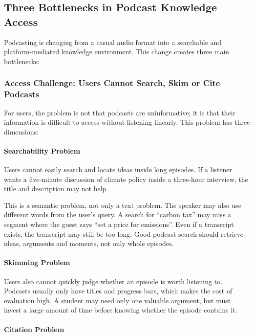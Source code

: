 \documentclass[11pt,a4paper]{article}
\begin{document}
\subsection{Three Bottlenecks in Podcast Knowledge Access}

Podcasting is changing from a casual audio format into a searchable and platform-mediated knowledge environment. This change creates three main bottlenecks:

\subsubsection{Access Challenge: Users Cannot Search, Skim or Cite Podcasts}

For users, the problem is not that podcasts are uninformative; it is that their information is difficult to access without listening linearly. This problem has three dimensions:



\paragraph{Searchability Problem}

Users cannot easily search and locate ideas inside long episodes. If a listener wants a five-minute discussion of climate policy inside a three-hour interview, the title and description may not help.

This is a semantic problem, not only a text problem. The speaker may also use different words from the user's query. A search for ``carbon tax'' may miss a segment where the guest says ``set a price for emissions''.
 Even if a transcript exists, the transcript may still be too long. Good podcast search should retrieve ideas, arguments and moments, not only whole episodes.

\paragraph{Skimming Problem}

Users also cannot quickly judge whether an episode is worth listening to. Podcasts usually only have titles and progress bars, which makes the cost of evaluation high. A student may need only one valuable argument, but must invest a large amount of time before knowing whether the episode contains it.

\paragraph{Citation Problem}
\end{document}
